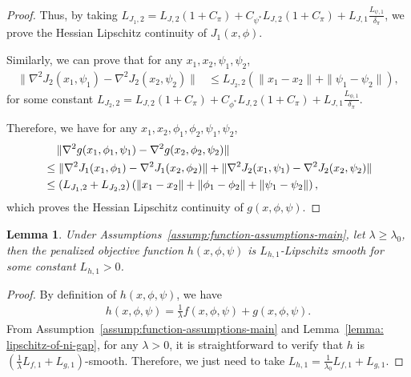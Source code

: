 \documentclass{article}
\theoremstyle{plain}
\newtheorem{lemma}{Lemma}
\theoremstyle{definition}
\theoremstyle{remark}
\begin{document}
\begin{proof}
    Thus, by taking $L_{J_1,2} = L_{J,2} (1 + C_{\pi}) + C_{\psi^*} L_{J,2} (1 + C_{\pi}) +  L_{J,1} \frac{L_{\psi,1}}{\delta_\pi}$, we prove the Hessian Lipschitz continuity of $J_1(x,\phi)$.

    Similarly, we can prove that for any $x_1,x_2,\psi_1,\psi_2$, 
    \begin{align}
        \| \nabla^2 J_2(x_1,\psi_1)  - \nabla^2 J_2(x_2,\psi_2) \| & \leq L_{J_2,2} \left( \| x_1 - x_2 \| + \| \psi_1 - \psi_2 \| \right) ,
    \end{align}
    for some constant $L_{J_2,2} = L_{J,2} (1 + C_{\pi}) + C_{\phi^*} L_{J,2} (1 + C_{\pi}) +  L_{J,1} \frac{L_{\phi,1}}{\delta_\pi}$.

    Therefore, we have for any $x_1,x_2,\phi_1,\phi_2,\psi_1,\psi_2$,
    \begin{align}
        & \quad \, \| \nabla^2 g(x_1,\phi_1,\psi_1) - \nabla^2 g(x_2,\phi_2,\psi_2) \| \notag\\
        & \leq \| \nabla^2 J_1(x_1,\phi_1)  - \nabla^2 J_1(x_2,\phi_2) \| + \| \nabla^2 J_2(x_1,\psi_1)  - \nabla^2 J_2(x_2,\psi_2) \| \notag \\
        & \leq (L_{J_1,2} + L_{J_2,2}) \left( \| x_1 - x_2 \| + \| \phi_1 - \phi_2 \| + \| \psi_1 - \psi_2 \| \right) ,
    \end{align}
    which proves the Hessian Lipschitz continuity of $g(x,\phi,\psi)$.
\end{proof}


\begin{lemma}
    \label{lemma: lipschitz-constant-of-penalized-objective}
    Under Assumptions~\ref{assump:function-assumptions-main}, let $\lambda \ge \lambda_0$, then the penalized objective function $h(x,\phi,\psi)$ is $L_{h,1}$-Lipschitz smooth for some constant $L_{h,1} > 0$.
\end{lemma}
\begin{proof}
    By definition of $h(x,\phi,\psi)$, we have
    \begin{align*}
        h(x,\phi,\psi) = \frac{1}{\lambda} f(x,\phi,\psi) + g(x,\phi,\psi) .
    \end{align*}
    From Assumption~\ref{assump:function-assumptions-main} and Lemma~\ref{lemma: lipschitz-of-ni-gap}, for any $\lambda > 0$, it is straightforward to verify that $h$ is $\left(\frac{1}{\lambda} L_{f,1} + L_{g,1}\right)$-smooth. Therefore, we just need to take $L_{h,1} = \frac{1}{\lambda_0} L_{f,1} + L_{g,1}$.
\end{proof}
\end{document}
